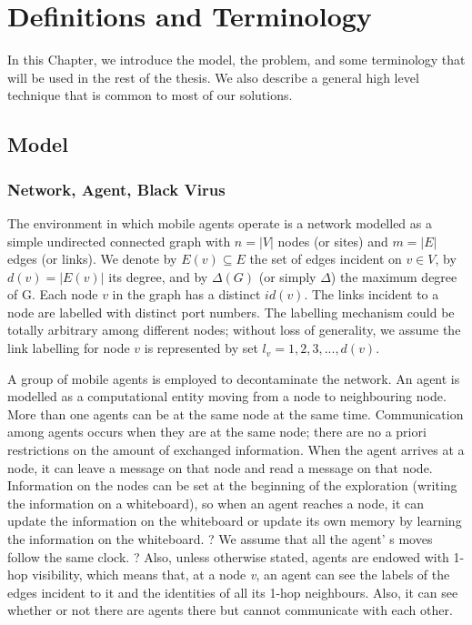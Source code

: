 \chapter {Definitions and Terminology}
\label{PM}
In this Chapter, we introduce the model, the problem, and some terminology that will be used in the rest of the thesis. We also  describe a general high level technique that is common to most of our solutions.

\section{Model}
\subsection{Network, Agent, Black Virus}

 The environment in which mobile agents operate is a network modelled as a simple undirected connected graph with $n = \left |V\right |$ nodes (or sites) and $m = \left |E\right |$ edges (or links). We denote by $E (v)\subseteq E$ the set of edges incident on $v\in V$, by $d (v) = \left|E (v)\right|$ its degree, and by $\Delta(G)$ (or simply $\Delta$) the maximum degree of G. Each node $v$ in the graph has a distinct $id(v)$. The links incident to a node are labelled with distinct port numbers. The labelling mechanism could be totally arbitrary among different nodes; without loss of generality, we assume the link labelling for node $v$ is represented by set $l_v =1,2,3,...,d(v)$. 

 A group of mobile agents is employed to decontaminate the network. An agent is modelled as a computational entity moving from a node to neighbouring node. More than one agents can be at the same node at the same time. Communication among agents occurs when they are at the same node; there are no a priori restrictions on the amount of exchanged information. When the agent arrives at a node, it can leave a message on that node and read a message on that node. Information on the nodes can be set  at the beginning of the exploration (writing the information on a whiteboard), so when an agent reaches a node, it can update the information on the whiteboard or update its own memory by learning the information on the whiteboard.  \color{blue} ? We assume that all the agent' s moves follow the same clock. ? \color{black} 
Also, unless otherwise stated, agents are endowed with 1-hop visibility, which means that, at a node {\em v}, an agent can see the labels of the edges incident to it and the identities of all its 1-hop neighbours. Also, it can   see whether or not there are agents there but cannot communicate with each other. 

